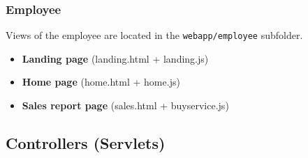 \subsubsection*{Employee}

Views of the employee are located in the \texttt{webapp/employee} subfolder.

\begin{itemize}
    \item \textbf{Landing page} (landing.html + landing.js)
    \item \textbf{Home page} (home.html + home.js)
    \item \textbf{Sales report page} (sales.html + buyservice.js)
\end{itemize}

\subsection{Controllers (Servlets)}

